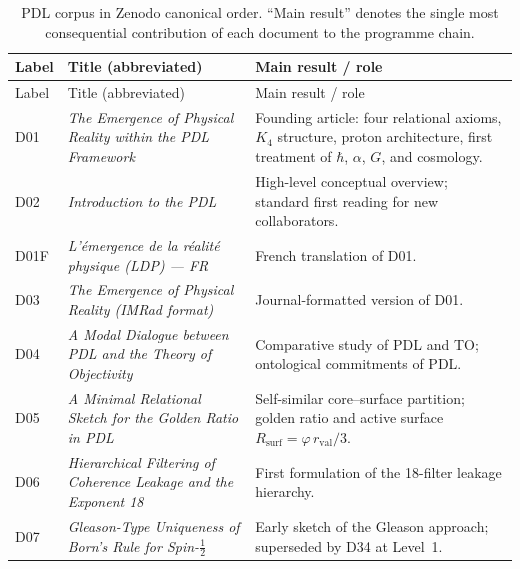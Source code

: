 \documentclass[11pt,a4paper]{article}
\theoremstyle{plain}
\theoremstyle{definition}
\theoremstyle{remark}
\newcommand{\Kfour}{K_4}
\newcommand{\rval}{r_{\mathrm{val}}}
\newcommand{\Rsurf}{R_{\mathrm{surf}}}
\begin{document}
\setlength{\LTpre}{12pt}
\setlength{\LTpost}{6pt}

\begin{longtable}{@{}L{1.3cm}L{3.8cm}L{8.0cm}@{}}
\caption{PDL corpus in Zenodo canonical order. ``Main result'' denotes the single most consequential contribution of each document to the programme chain.}
\label{tab:documents}\\
\toprule
Label & Title (abbreviated) & Main result / role \\
\midrule
\endfirsthead
\toprule
Label & Title (abbreviated) & Main result / role \\
\midrule
\endhead
\bottomrule
\endfoot

D01 & \textit{The Emergence of Physical Reality within the PDL Framework}~\citep{D01} & Founding article: four relational axioms, $\Kfour$ structure, proton architecture, first treatment of $\hbar$, $\alpha$, $G$, and cosmology. \\[0.3em]

D02 & \textit{Introduction to the PDL}~\citep{D02} & High-level conceptual overview; standard first reading for new collaborators. \\[0.3em]

D01F & \textit{L'\'emergence de la r\'ealit\'e physique (LDP) — FR}~\citep{D01F} & French translation of D01. \\[0.3em]

D03 & \textit{The Emergence of Physical Reality (IMRad format)}~\citep{D03} & Journal-formatted version of D01. \\[0.3em]

D04 & \textit{A Modal Dialogue between PDL and the Theory of Objectivity}~\citep{D04} & Comparative study of PDL and TO; ontological commitments of PDL. \\[0.3em]

D05 & \textit{A Minimal Relational Sketch for the Golden Ratio in PDL}~\citep{D05} & Self-similar core--surface partition; golden ratio and active surface $\Rsurf = \varphi\,\rval/3$. \\[0.3em]

D06 & \textit{Hierarchical Filtering of Coherence Leakage and the Exponent 18}~\citep{D06} & First formulation of the 18-filter leakage hierarchy. \\[0.3em]

D07 & \textit{Gleason-Type Uniqueness of Born's Rule for Spin-$\tfrac{1}{2}$}~\citep{D07} & Early sketch of the Gleason approach; superseded by D34 at Level~1. \\[0.3em]


\end{longtable}
\end{document}
